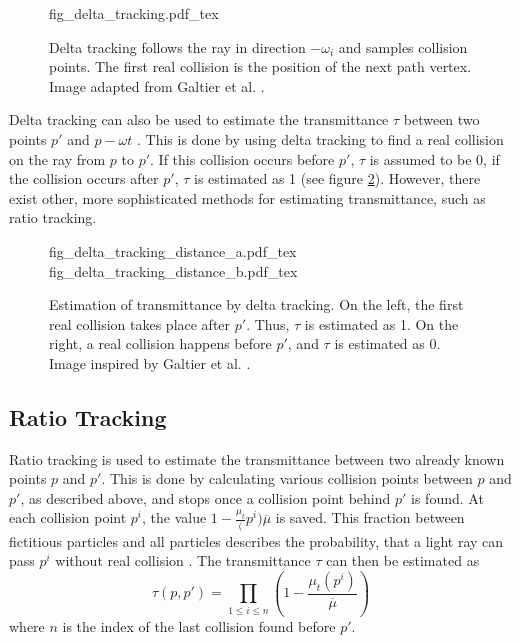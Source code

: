 \begin{figure}
\centering
\def\svgwidth{\columnwidth}
{fig_delta_tracking.pdf_tex}

\caption{Delta tracking follows the ray in direction $-\omega_i$ and samples collision points. The first real collision is the position of the next path vertex. Image adapted from Galtier et al. \cite{GALTIER201357}.}
\label{fig:delta_tracking}
\end{figure}


Delta tracking can also be used to estimate the transmittance $\tau$ between two points $p'$ and $p - \omega t$\cite{10.1145/2661229.2661292} \cite{10.1145/2661229.2661292}. This is done by using delta tracking to find a real collision on the ray from $p$ to $p'$. If this collision occurs before $p'$, $\tau$ is assumed to be 0, if the collision occurs after $p'$, $\tau$ is estimated as 1 (see figure \ref{fig:delta_tracking_distance}). However, there exist other, more sophisticated methods for estimating transmittance, such as ratio tracking.

\begin{figure}

\fontsize{7}{9}\selectfont
    \def\svgwidth{.48\columnwidth}
    {fig_delta_tracking_distance_a.pdf_tex}
    \hfill
    \def\svgwidth{.48\columnwidth}
    {fig_delta_tracking_distance_b.pdf_tex}


\caption{Estimation of transmittance by delta tracking. On the left, the first real collision takes place after $p'$. Thus, $\tau$ is estimated as 1. On the right, a real collision happens before $p'$, and $\tau$ is estimated as 0. Image inspired by Galtier et al. \cite{GALTIER201357}.} \label{fig:delta_tracking_distance}
\end{figure}


\subsection{Ratio Tracking}
Ratio tracking \cite{10.1145/2661229.2661292} is used to estimate the transmittance between two already known points $p$ and $p'$. This is done by calculating various collision points between $p$ and $p'$, as described above, and stops once a collision point behind $p'$ is found. At each collision point $p^i$, the value $1 - \frac{\mu_t}(p^i){\overline{\mu}}$ is saved. This fraction between fictitious particles and all particles describes the probability, that a light ray can pass $p^i$ without real collision \cite{10.1145/2661229.2661292}. The transmittance $\tau$ can then be estimated as 
\begin{equation}
\tau(p,p') = \prod_{1 \le i \le n}(1 - \frac{\mu_t(p^i)}{\overline{\mu}})
\end{equation}
where $n$ is the index of the last collision found before $p'$.
